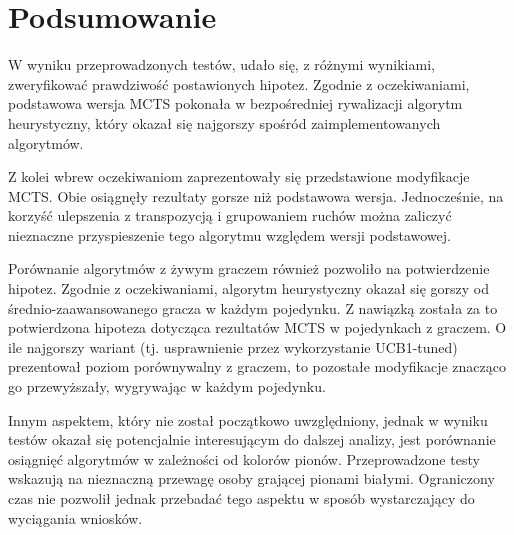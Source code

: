\documentclass[10pt]{article}
\begin{document}
\section{Podsumowanie}
W wyniku przeprowadzonych testów, udało się, z różnymi wynikiami, zweryfikować prawdziwość postawionych hipotez. Zgodnie z oczekiwaniami, podstawowa wersja MCTS pokonała w bezpośredniej rywalizacji algorytm heurystyczny, który okazał się najgorszy spośród zaimplementowanych algorytmów.

Z kolei wbrew oczekiwaniom zaprezentowały się przedstawione modyfikacje MCTS. Obie osiągnęły rezultaty gorsze niż podstawowa wersja. Jednocześnie, na korzyść ulepszenia z transpozycją i grupowaniem ruchów można zaliczyć nieznaczne przyspieszenie tego algorytmu względem wersji podstawowej.

Porównanie algorytmów z żywym graczem również pozwoliło na potwierdzenie hipotez. Zgodnie z oczekiwaniami, algorytm heurystyczny okazał się gorszy od średnio-zaawansowanego gracza w każdym pojedynku. Z nawiązką została za to potwierdzona hipoteza dotycząca rezultatów MCTS w pojedynkach z graczem. O ile najgorszy wariant (tj. usprawnienie przez wykorzystanie UCB1-tuned) prezentował poziom porównywalny z graczem, to pozostałe modyfikacje znacząco go przewyższały, wygrywając w każdym pojedynku.

Innym aspektem, który nie został początkowo uwzględniony, jednak w wyniku testów okazał się potencjalnie interesującym do dalszej analizy, jest porównanie osiągnięć algorytmów w zależności od kolorów pionów. Przeprowadzone testy wskazują na nieznaczną przewagę osoby grającej pionami białymi. Ograniczony czas nie pozwolił jednak przebadać tego aspektu w sposób wystarczający do wyciągania wniosków.

\printbibliography
\end{document}

